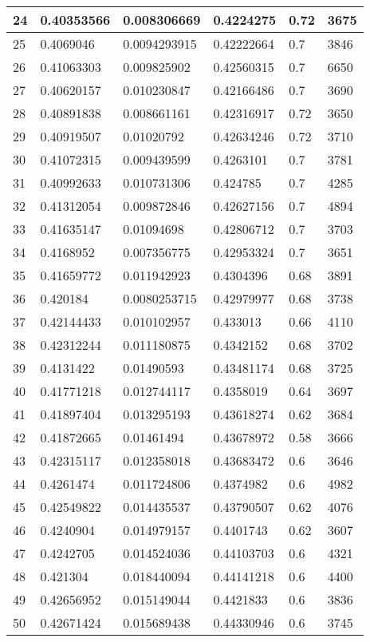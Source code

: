 \begin{longtable}{|l|l|l|l|l|l|}
24 & 0.40353566 & 0.008306669 & 0.4224275 & 0.72 & 3675 \\ \hline 
25 & 0.4069046 & 0.0094293915 & 0.42222664 & 0.7 & 3846 \\ \hline 
26 & 0.41063303 & 0.009825902 & 0.42560315 & 0.7 & 6650 \\ \hline 
27 & 0.40620157 & 0.010230847 & 0.42166486 & 0.7 & 3690 \\ \hline 
28 & 0.40891838 & 0.008661161 & 0.42316917 & 0.72 & 3650 \\ \hline 
29 & 0.40919507 & 0.01020792 & 0.42634246 & 0.72 & 3710 \\ \hline 
30 & 0.41072315 & 0.009439599 & 0.4263101 & 0.7 & 3781 \\ \hline 
31 & 0.40992633 & 0.010731306 & 0.424785 & 0.7 & 4285 \\ \hline 
32 & 0.41312054 & 0.009872846 & 0.42627156 & 0.7 & 4894 \\ \hline 
33 & 0.41635147 & 0.01094698 & 0.42806712 & 0.7 & 3703 \\ \hline 
34 & 0.4168952 & 0.007356775 & 0.42953324 & 0.7 & 3651 \\ \hline 
35 & 0.41659772 & 0.011942923 & 0.4304396 & 0.68 & 3891 \\ \hline 
36 & 0.420184 & 0.0080253715 & 0.42979977 & 0.68 & 3738 \\ \hline 
37 & 0.42144433 & 0.010102957 & 0.433013 & 0.66 & 4110 \\ \hline 
38 & 0.42312244 & 0.011180875 & 0.4342152 & 0.68 & 3702 \\ \hline 
39 & 0.4131422 & 0.01490593 & 0.43481174 & 0.68 & 3725 \\ \hline 
40 & 0.41771218 & 0.012744117 & 0.4358019 & 0.64 & 3697 \\ \hline 
41 & 0.41897404 & 0.013295193 & 0.43618274 & 0.62 & 3684 \\ \hline 
42 & 0.41872665 & 0.01461494 & 0.43678972 & 0.58 & 3666 \\ \hline 
43 & 0.42315117 & 0.012358018 & 0.43683472 & 0.6 & 3646 \\ \hline 
44 & 0.4261474 & 0.011724806 & 0.4374982 & 0.6 & 4982 \\ \hline 
45 & 0.42549822 & 0.014435537 & 0.43790507 & 0.62 & 4076 \\ \hline 
46 & 0.4240904 & 0.014979157 & 0.4401743 & 0.62 & 3607 \\ \hline 
47 & 0.4242705 & 0.014524036 & 0.44103703 & 0.6 & 4321 \\ \hline 
48 & 0.421304 & 0.018440094 & 0.44141218 & 0.6 & 4400 \\ \hline 
49 & 0.42656952 & 0.015149044 & 0.4421833 & 0.6 & 3836 \\ \hline 
50 & 0.42671424 & 0.015689438 & 0.44330946 & 0.6 & 3745 \\ \hline 
\end{longtable}